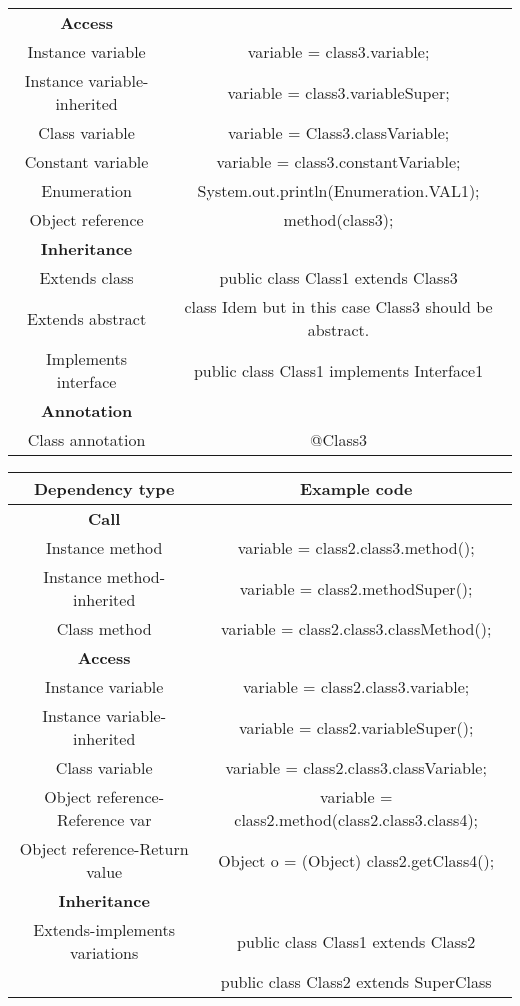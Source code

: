 \begin{center}
\begin{tabular}{|c c|}
        \textbf{Access} &  \\
        Instance variable & variable = class3.variable; \\
        Instance variable-inherited & variable = class3.variableSuper; \\
        Class variable & variable = Class3.classVariable; \\
        Constant variable & variable = class3.constantVariable; \\
        Enumeration & System.out.println(Enumeration.VAL1); \\
        Object reference & method(class3); \\
        \textbf{Inheritance} &  \\
        Extends class & public class Class1 extends Class3 { } \\
        Extends abstract & class Idem but in this case Class3 should be abstract. \\
        Implements interface & public class Class1 implements Interface1 { } \\
        \textbf{Annotation} &  \\
        Class annotation & @Class3 \\
        \hline
    \end{tabular}
\end{center}

\begin{center}
    \centering
    \begin{tabular}{|c c|}
        \hline
        Dependency type & Example code \\
        \hline
        \textbf{Call} &  \\
        Instance method & variable = class2.class3.method(); \\
        Instance method-inherited & variable = class2.methodSuper(); \\
        Class method & variable = class2.class3.classMethod(); \\
        \textbf{Access} &  \\
        Instance variable & variable = class2.class3.variable; \\
        Instance variable-inherited & variable = class2.variableSuper(); \\
        Class variable & variable = class2.class3.classVariable; \\
        Object reference-Reference var & variable = class2.method(class2.class3.class4); \\
        Object reference-Return value & Object o = (Object) class2.getClass4(); \\
        \textbf{Inheritance} &  \\
        Extends-implements variations & public class Class1 extends Class2 { } \\
         & public class Class2 extends SuperClass { } \\
        \hline
    \end{tabular}
\end{center}

